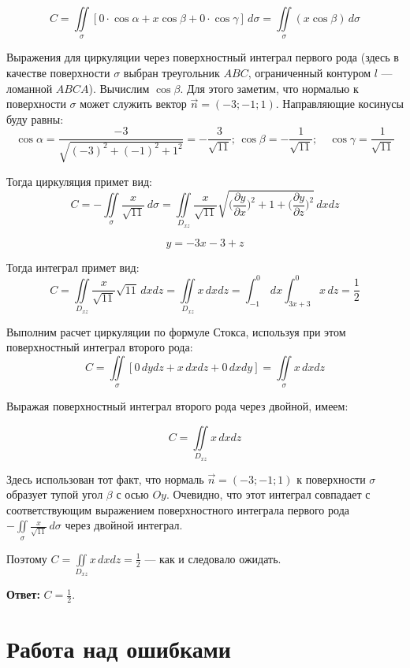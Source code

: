 \documentclass[12pt]{article}
\begin{document}
	$$ C = \iint \limits_{\sigma} [ 0 \cdot \cos{\alpha} + x \cos{\beta} + 0 \cdot \cos{\gamma} ] \, d\sigma = \iint \limits_{\sigma} ( x \cos{\beta} ) \, d\sigma $$

	Выражения для циркуляции через поверхностный интеграл первого рода (здесь в качестве поверхности $ \sigma $ выбран треугольник $ ABC $, ограниченный контуром $ l $ --- ломанной $ ABCA $). Вычислим $ \cos{\beta} $. Для этого заметим, что нормалью к поверхности $ \sigma $ может служить вектор $ \vec{n} = (-3;-1;1)$. Направляющие косинусы буду равны: 
	$$ \cos{\alpha} = \frac{-3}{\sqrt{ (-3)^2 + (-1)^2 + 1^2 }} = -\frac{ 3 }{ \sqrt{ 11 } }; \, \cos\beta = - \frac{1}{\sqrt{11}};\quad \cos\gamma = \frac{1}{\sqrt{11}} $$
	
	Тогда циркуляция примет вид: 
	$$ C = - \iint \limits_{\sigma}  \frac{x}{\sqrt{11}}  \, d\sigma  = \iint \limits_{D_{xz}}  \frac{x}{\sqrt{11}} \sqrt{ \Big(\frac{\partial y}{\partial x}\Big)^2 + 1 + \Big(\frac{\partial y}{\partial z } \Big)^2 } \, dxdz  $$

	$$ y = - 3x - 3 + z $$

	Тогда интеграл примет вид:
	$$ C = \iint \limits_{D_{xz}}  \frac{x}{\sqrt{11}} \sqrt{11} \, dxdz = \iint \limits_{D_{xz}}  x \, dxdz = \int_{-1}^{0} \, dx \int_{3x+3}^{0} x \, dz = \frac{1}{2}$$

	Выполним расчет циркуляции по формуле Стокса, используя при этом поверхностный интеграл второго рода: 
	$$ C = \iint \limits_{\sigma} [ 0 \, dydz + x \, dxdz + 0 \, dxdy ] = \iint \limits_{\sigma} x \, dxdz $$

	Выражая поверхностный интеграл второго рода через двойной, имеем:

	$$ C = \iint \limits_{D_{xz}} x \, dxdz $$

	Здесь использован тот факт, что нормаль $ \vec{n} = (-3;-1;1)$ к поверхности $ \sigma $ образует тупой угол $ \beta $ с осью $ Oy $. Очевидно, что этот интеграл совпадает с соответствующим выражением поверхностного интеграла первого рода $ - \iint \limits_{\sigma}  \frac{x}{\sqrt{11}}  \, d\sigma $ через двойной интеграл.

	Поэтому $ C = \iint \limits_{D_{xz}} x \, dxdz = \frac{1}{2} $ --- как и следовало ожидать.

	\hspace{290pt}\textbf{Ответ:} $ C = \frac{1}{2}.$

	\newpage
	\section*{Работа над ошибками}
\end{document}
